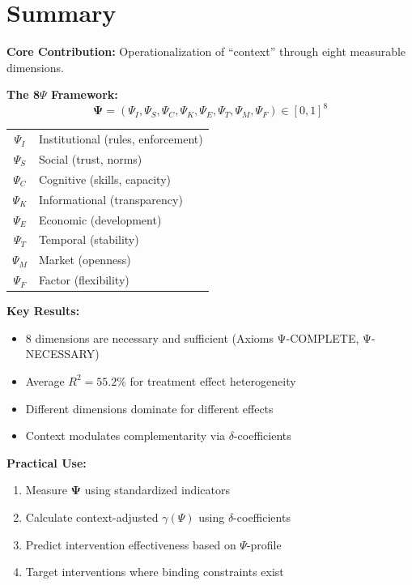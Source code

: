 \section{Summary}
\label{sec:V-summary}

\begin{tcolorbox}[colback=green!10!white, colframe=green!75!black, 
    title=\textbf{Appendix CTW: Complete Summary}]

\textbf{Core Contribution:} 
Operationalization of ``context'' through eight measurable dimensions.

\textbf{The 8$\Psi$ Framework:}
\[
\boldsymbol{\Psi} = (\Psi_I, \Psi_S, \Psi_C, \Psi_K, \Psi_E, \Psi_T, \Psi_M, \Psi_F) \in [0,1]^8
\]

\begin{center}
\small
\begin{tabular}{@{}cl@{}}
$\Psi_I$ & Institutional (rules, enforcement) \\
$\Psi_S$ & Social (trust, norms) \\
$\Psi_C$ & Cognitive (skills, capacity) \\
$\Psi_K$ & Informational (transparency) \\
$\Psi_E$ & Economic (development) \\
$\Psi_T$ & Temporal (stability) \\
$\Psi_M$ & Market (openness) \\
$\Psi_F$ & Factor (flexibility) \\
\end{tabular}
\end{center}

\textbf{Key Results:}
\begin{itemize}[nosep]
    \item 8 dimensions are necessary and sufficient (Axioms Ψ-COMPLETE, Ψ-NECESSARY)
    \item Average $R^2 = 55.2\%$ for treatment effect heterogeneity
    \item Different dimensions dominate for different effects
    \item Context modulates complementarity via $\delta$-coefficients
\end{itemize}

\textbf{Practical Use:}
\begin{enumerate}[nosep]
    \item Measure $\boldsymbol{\Psi}$ using standardized indicators
    \item Calculate context-adjusted $\gamma(\Psi)$ using $\delta$-coefficients
    \item Predict intervention effectiveness based on $\Psi$-profile
    \item Target interventions where binding constraints exist
\end{enumerate}

\end{tcolorbox}

